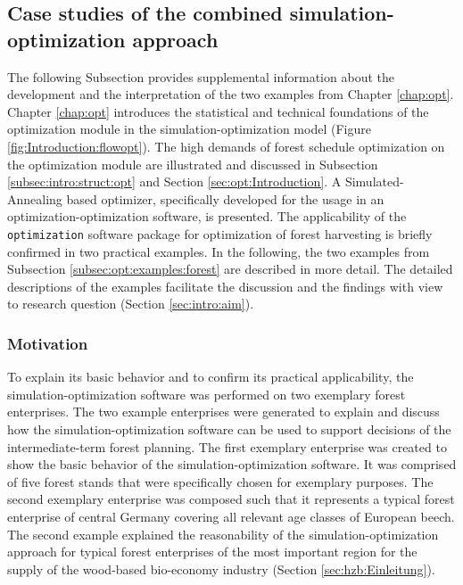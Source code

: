 \subsection{Case studies of the combined simulation-optimization approach}
\label{subsec:discussion:struct:opt:application}
The following Subsection provides supplemental information about the development and the interpretation of the two examples from Chapter \ref{chap:opt}. Chapter \ref{chap:opt} introduces the statistical and technical foundations of the optimization module in the simulation-optimization model (Figure \ref{fig:Introduction:flowopt}). The high demands of forest schedule optimization on the optimization module are illustrated and discussed in Subsection \ref{subsec:intro:struct:opt} and Section \ref{sec:opt:Introduction}. A Simulated-Annealing based optimizer, specifically developed for the usage in an optimization-optimization software, is presented. The applicability of the \texttt{optimization} software package for optimization of forest harvesting is briefly confirmed in two practical examples. In the following, the two examples from Subsection \ref{subsec:opt:examples:forest} are described in more detail. The detailed descriptions of the examples facilitate the discussion and the findings with view to research question (Section \ref{sec:intro:aim}).

\subsubsection{Motivation}
\label{subsubsec:discussion:struct:opt:application:introduction}
To explain its basic behavior and to confirm its practical applicability, the si\-mu\-la\-tion-op\-ti\-mi\-za\-tion software was performed on two exemplary forest enterprises. The two example enterprises were generated to explain and discuss how the si\-mu\-la\-tion-op\-ti\-mi\-za\-tion software can be used to support decisions of the intermediate-term forest planning. The first exemplary enterprise was created to show the basic behavior of the si\-mu\-la\-tion-op\-ti\-mi\-za\-tion software. It was comprised of five forest stands that were specifically chosen for exemplary purposes. The second exemplary enterprise was composed such that it represents a typical forest enterprise of central Germany covering all relevant age classes of European beech. The second example explained the reasonability of the si\-mu\-la\-tion-op\-ti\-mi\-za\-tion approach for typical forest enterprises of the most important region for the supply of the wood-based bio-economy industry (Section \ref{sec:hzb:Einleitung}).


